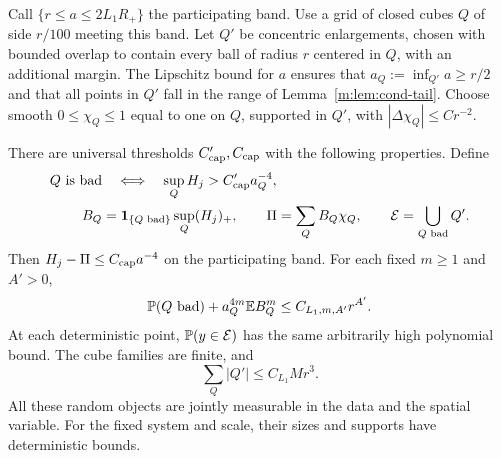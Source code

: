 Call $\{r\le a\le2L_1R_+\}$ the participating band. Use a grid of closed
cubes $Q$ of side $r/100$ meeting this band. Let $Q'$ be concentric
enlargements, chosen
with bounded overlap to contain every ball of radius $r$ centered in
$Q$, with an additional margin. The Lipschitz bound for $a$ ensures
that $a_Q:=\inf_{Q'}a\ge r/2$ and that all points in $Q'$ fall in the
range of Lemma~\ref{m:lem:cond-tail}. Choose smooth $0\le\chi_Q\le1$
equal to one on $Q$, supported in $Q'$, with
$|\Delta\chi_Q|\le Cr^{-2}$.

\begin{lemma}\label{m:lem:cond-cap}
There are universal thresholds $C'_{\rm cap},C_{\rm cap}$ with the
following properties. Define
\[
 \begin{split}
 Q\text{ is bad}&\quad\Longleftrightarrow\quad
       \sup_QH_j>C'_{\rm cap}a_Q^{-4},\\
 B_Q&=\mathbf 1_{\{Q\text{ bad}\}}\sup_Q(H_j)_+,
 \qquad \Pi=\sum_QB_Q\chi_Q,\qquad
 \mathcal E=\bigcup_{Q\text{ bad}}Q'.
 \end{split}
\]
Then $H_j-\Pi\le C_{\rm cap}a^{-4}$ on the participating band.
For each fixed $m\ge1$ and $A'>0$,
\begin{equation}\label{m:eq:cond-cap-moments}
 \mathbb P(Q\text{ bad})+a_Q^{4m}\mathbb E B_Q^m
       \le C_{L_1,m,A'}r^{A'}.
\end{equation}
At each deterministic point, $\mathbb P(y\in\mathcal E)$ has the same
arbitrarily high polynomial bound. The cube families are finite, and
\begin{equation}\label{m:eq:cond-band-volume}
 \sum_Q|Q'|\le C_{L_1}Mr^3.
\end{equation}
All these random objects are jointly measurable in the data and the
spatial variable. For the fixed system and scale, their sizes and
supports have deterministic bounds.
\end{lemma}

